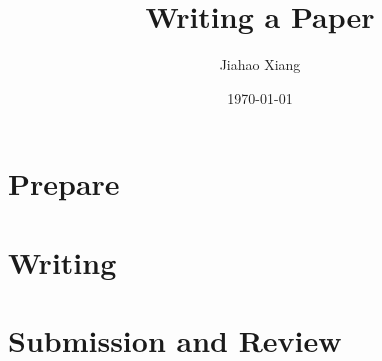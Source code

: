 \documentclass{beamer}
\title{Writing a Paper}
\author[xjh]{Jiahao Xiang\inst{1}}
\institute{
    \inst{1}
    Hengyang Normal University
}
\date{\today}
\begin{document}
\begin{frame}
    \titlepage
\end{frame}


\section{Prepare}


\section{Writing}

\section{Submission and Review}
\end{document}
